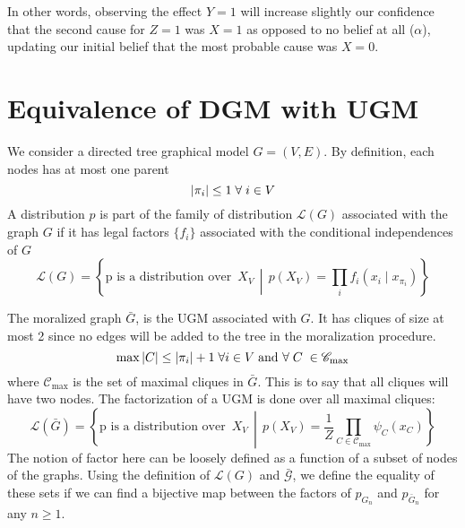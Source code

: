 \documentclass{article}
\numberwithin{equation}{section}
\newcommand{\s}{\hspace{0.1cm}}
\theoremstyle{named}
\begin{document}
In other words, observing the effect $Y = 1$ will increase slightly our confidence 
that the second cause for $Z = 1$ was $X = 1$ as opposed to no belief at all 
($\alpha$), updating our initial belief that the 
most probable cause was $X = 0$.


\section{Equivalence of DGM with UGM}
We consider a directed tree graphical model $G = (V, E)$. By definition, each nodes has at most 
one parent 
\[
        |\pi_i| \leq 1\s \forall \s i \in V 
\]
A distribution $p$ is part of the family of distribution $\mathcal{L}(G)$
associated with the graph $G$ if it has legal factors $\{f_i\}$ associated with
the conditional 
independences of $G$
\[
        \mathcal{L}(G) = \left\{ \text{p is a distribution over }\, X_V
        \,\middle\vert\, 
        p(X_V) = \prod_{i} f_i(x_i \mid x_{\pi_i})
        \right\}
\]

The moralized graph $\bar{G}$, is the UGM associated with $G$. It has cliques 
of size at most 2 since no edges will be added to the tree in the moralization 
procedure. 
\[
        \max |C| \leq |\pi_i| + 1 \s \forall i \in V\s \text{and } 
        \forall \s C \s \in \mathscr{C}_{\max}
\]
where $\mathscr{C}_{\max}$ is the set of maximal cliques in $\bar{G}$.
This is to say that all cliques will have two nodes. The 
factorization of a UGM is done over all maximal cliques:
\[
        \mathcal{L}(\bar{G}) = \left\{   \text{p is a distribution over }\, X_V
        \,\middle\vert\, 
        p(X_V) = \frac{1}{Z} \prod_{C \in \mathscr{C}_{\max}} \psi_C(x_C) 
 \right\}
\]
The notion of factor here can be loosely defined as a function of a subset 
of nodes of the graphs. Using the definition of $\mathcal{L}(G)$ and 
$\mathcal{\bar{G}}$, we define the equality of these sets if we can find 
a bijective map between the factors of $p_{G_n}$ and $p_{\bar{G}_n}$ for 
any $n \geq 1$.
\end{document}
